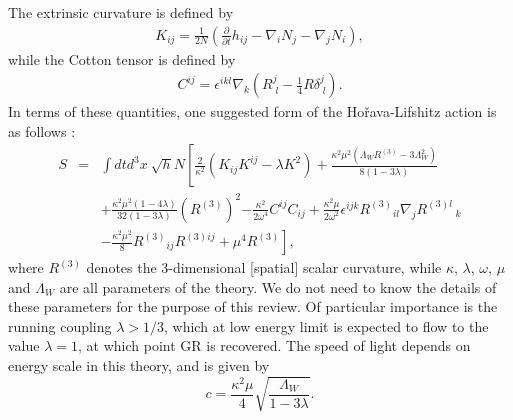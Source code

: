 \documentclass[12pt]{article}
\newcommand{\2}{$^2$}
\newcommand{\3}{$^3$}
\newcommand{\4}{$_4$}
\newcommand{\5}{$_5$}
\begin{document}
\begin{description}
The extrinsic curvature is defined by
\begin{eqnarray}
K_{ij} = \frac{1}{2N} \left( \frac{\partial}{\partial t} h_{ij} - \nabla_{i}N_{j} - \nabla_{j}N_{i} \right),
\end{eqnarray}
while the Cotton tensor is defined by
\begin{eqnarray}
C^{ij} = \epsilon^{ikl} \nabla_{k} \left( R^{j}_{\;l} - \frac{1}{4} R \delta^{j}_{\;l} \right).
\end{eqnarray}
In terms of these quantities, one suggested form of the Ho\v{r}ava-Lifshitz action is as follows \cite{Horava:2009uw}:
\begin{eqnarray}
S &=& \int dt d^{3}x~ \sqrt{h}N \left[ \frac{2}{\kappa^{2}} \left( K_{ij}K^{ij} - \lambda K^{2} \right) + \frac{\kappa^{2}\mu^{2} (\Lambda_{W} R^{(3)} - 3 \Lambda_{W}^{2})}{8 (1-3\lambda)} \right. \nonumber\\
&&+ \frac{\kappa^{2}\mu^{2}(1-4\lambda)}{32(1-3\lambda)} \left(R^{(3)}\right)^{2}\left. - \frac{\kappa^{2}}{2\omega^{4}} C^{ij}C_{ij} + \frac{\kappa^{2}\mu}{2\omega^{2}} \epsilon^{ijk}{R^{(3)}}_{il}\nabla_{j}{R^{(3)l}}_{\;k}  \right. \nonumber \\
&&- \left. \frac{\kappa^{2}\mu^{2}}{8} {R^{(3)}}_{ij} {R^{(3)ij}}+ \mu^{4} R^{(3)} \right],
\end{eqnarray}
where $R^{(3)}$ denotes the 3-dimensional [spatial] scalar curvature, while  $\kappa$, $\lambda$, $\omega$, $\mu$ and $\Lambda_W$ are all parameters of the theory. 
We do not need to know the details of these parameters for the purpose of this review.
Of particular importance is the running coupling $\lambda > 1/3$, which at low energy limit is expected to flow to the value $\lambda=1$, at which point GR is recovered. 
The speed of light depends on energy scale in this theory, and is given by
\begin{equation}
c=\frac{\kappa^2 \mu}{4}\sqrt{\frac{\Lambda_W}{1-3\lambda}}.
\end{equation}


\end{description}
\end{document}
